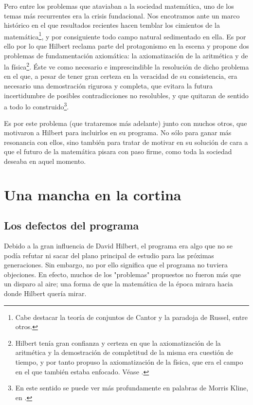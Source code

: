 Pero entre los problemas que ataviaban a la sociedad matemática, uno de los temas más recurrentes era la crisis fundacional. Nos encotramos ante un marco histórico 
en el que resultados recientes hacen temblar los cimientos de la matemática\footnote{Cabe destacar la teoría de conjuntos de Cantor y la paradoja 
de Russel, entre otros.}, y por consiguiente todo campo natural sedimentado en ella. Es por ello por lo que Hilbert reclama parte del protagonismo en la escena y propone dos problemas
de fundamentación axiomática: la axiomatización de la aritmética y de la física\footnote{Hilbert tenía gran confianza y certeza en que la axiomatización de la aritmética y la demostración de 
completitud de la misma era cuestión de tiempo, y por tanto propuso la axiomatización de la física, que era el campo en el que también estaba enfocado. Véase \cite{kreisel1976have}.}.
Éste ve como necesario e imprescindible la resolución de dicho problema en el que, a pesar de tener gran certeza en la veracidad de su consistencia, era necesario una demostración rigurosa
y completa, que evitara la futura incertidumbre de posibles contradicciones no resolubles, y que quitaran de sentido a todo lo construido\footnote{En este sentido se puede ver más profundamente 
en palabras de Morris Kline, en \cite{kline2000matematicas}.}.

Es por este problema (que trataremos más adelante) junto con muchos otros, que motivaron a Hilbert para incluirlos en su programa. No sólo para ganar más resonancia con ellos, sino 
también para tratar de motivar en su solución de cara a que el futuro de la matemática pisara con paso firme, como toda la sociedad deseaba en aquel momento.

\chapter{Una mancha en la cortina} \label{ch:Hilbert-2}

\section{Los defectos del programa}

Debido a la gran influencia de David Hilbert, el programa era algo que no se podía refutar ni sacar del plano principal de estudio para las próximas generaciones. Sin embargo,
no por ello significa que el programa no tuviera objeciones. En efecto, muchos de los "problemas" propuestos no fueron más que un disparo al aire; una forma de que la matemática 
de la época mirara hacia donde Hilbert quería mirar. 


